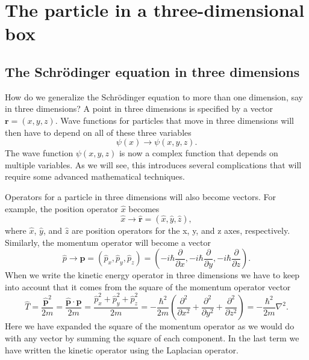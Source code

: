 \documentclass[../Main/chem331-notes.tex]{subfiles}
\begin{document}
\setcounter{section}{10}

\section{The particle in a three-dimensional box}
\subsection{The Schr\"{o}dinger equation in three dimensions}
How do we generalize the Schr\"{o}dinger equation to more than one dimension, say in three dimensions?
A point in three dimensions is specified by a vector $\mathbf{r} = (x,y,z)$.
Wave functions for particles that move in three dimensions will then have to depend on all of these three variables
\begin{equation}
\psi(x) \rightarrow \psi(x,y,z).
\end{equation}
The wave function $\psi(x,y,z)$ is now a complex function that depends on multiple variables.
As we will see, this introduces several complications that will require some advanced mathematical techniques.

Operators for a particle in three dimensions will also become vectors.
For example, the position operator $\hat{x}$ becomes
\begin{equation}
\hat{x} \rightarrow \hat{\mathbf{r}} = (\hat{x}, \hat{y}, \hat{z}),
\end{equation}
where $\hat{x}$, $\hat{y}$, and $\hat{z}$ are position operators for the x, y, and z axes, respectively.
Similarly, the momentum operator will become a vector
\begin{equation}
\hat{p} \rightarrow \hat{\mathbf{p}} =  (\hat{p}_{x}, \hat{p}_{y}, \hat{p}_{z})
= \left(-i\hbar\frac{\partial}{\partial x}, -i\hbar\frac{\partial}{\partial y}, -i\hbar\frac{\partial}{\partial z}\right).
\end{equation}
When we write the kinetic energy operator in three dimensions we have to keep into account that it comes from the square of the momentum operator vector
\begin{equation}
\hat{T} = \frac{\hat{\mathbf{p}}^2}{2m}
= \frac{\hat{\mathbf{p}} \cdot \hat{\mathbf{p}}}{2m} 
= \frac{\hat{p}_{x}^2 + \hat{p}_{y}^2 + \hat{p}_{z}^2}{2m} 
= -\frac{\hbar^2}{2m}
\left(\frac{\partial^2}{\partial x^2} + \frac{\partial^2}{\partial y^2} + \frac{\partial^2}{\partial z^2} \right) = -\frac{\hbar^2}{2m}\nabla^2.
\end{equation}
Here we have expanded the square of the momentum operator as we would do with any vector by summing the square of each component.
In the last term we have written the kinetic operator using the Laplacian operator.
\end{document}
